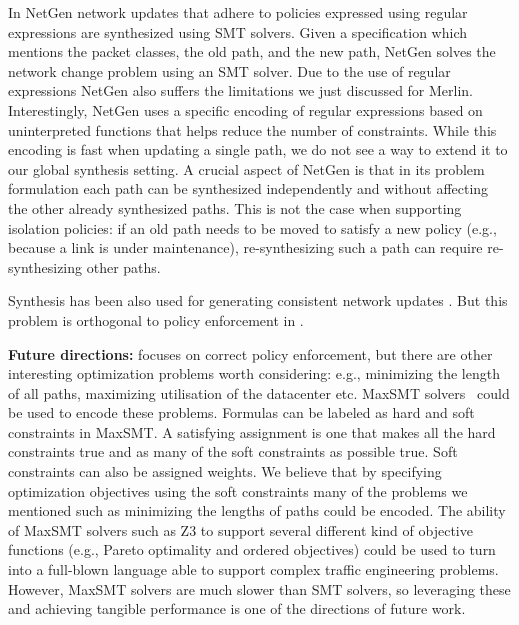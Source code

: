 In NetGen network updates that adhere to policies expressed using
regular expressions are synthesized using SMT solvers.  Given a
specification which mentions the packet classes, the old path, and the
new path, NetGen solves the network change problem using an SMT solver.
Due to the use of regular expressions NetGen also suffers the
limitations we just discussed for Merlin.  Interestingly, NetGen uses
a specific encoding of regular expressions based on uninterpreted
functions that helps reduce the number of constraints. While this
encoding is fast when updating a single path, we do not see a way to
extend it to our global synthesis setting.  A crucial aspect of NetGen
is that in its problem formulation each path can be synthesized
independently and without affecting the other already synthesized
paths.  This is not the case when supporting isolation policies: if an
old path needs to be moved to satisfy a new policy (e.g., because a
link is under maintenance), re-synthesizing such a path can require
re-synthesizing other paths. 

Synthesis has been also used for generating consistent network
updates \cite{updates, customconsistency}. But this problem is orthogonal to 
policy enforcement in \Name.


\noindent
{\bf Future directions:}
\Name focuses on correct policy enforcement, but there are other
interesting optimization problems worth considering: e.g., minimizing
the length of all paths, maximizing utilisation of the datacenter
etc. MaxSMT solvers~\cite{z3maxSMT} could be used to encode these problems.  
Formulas can be labeled as hard and soft constraints in MaxSMT. A
satisfying assignment is one that makes all the hard constraints true
and as many of the soft constraints as possible true.  Soft
constraints can also be assigned weights.  We believe that by specifying
optimization objectives using the soft constraints many of the problems
we mentioned such as minimizing the lengths of paths 
could be encoded.  The ability of MaxSMT solvers such as Z3
to support several different kind of objective functions (e.g., Pareto
optimality and ordered objectives) could be used to turn \Name into a
full-blown language able to support complex traffic engineering
problems.  However, MaxSMT solvers are much slower than SMT solvers,
so leveraging these and achieving tangible performance is one of the
directions of future work.
 
